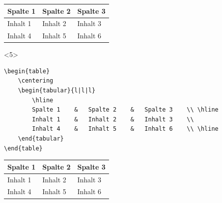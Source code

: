 \begin{frame}[fragile]
\begin{onlyenv}
\begin{outputbox}
			\begin{table}
				\centering
				\begin{tabular}{lll}
					\hline
					Spalte 1	&	Spalte 2	&	Spalte 3	\\ \hline
					Inhalt 1	&	Inhalt 2	&	Inhalt 3	\\
					Inhalt 4	&	Inhalt 5	&	Inhalt 6	\\ \hline	
				\end{tabular}
			\end{table}
		\end{outputbox}
	\end{onlyenv}
	\begin{onlyenv}
		\Code
		\begin{lstlisting}
\begin{table}
	\centering
	\begin{tabular}{l|l|l}
		\hline
		Spalte 1	&	Spalte 2	&	Spalte 3	\\ \hline
		Inhalt 1	&	Inhalt 2	&	Inhalt 3	\\
		Inhalt 4	&	Inhalt 5	&	Inhalt 6	\\ \hline
	\end{tabular}
\end{table}
		\end{lstlisting}
		\Ausgabe
		\begin{outputbox}
			\begin{table}
				\centering
				\begin{tabular}{l|l|l}
					\hline
					Spalte 1	&	Spalte 2	&	Spalte 3	\\ \hline
					Inhalt 1	&	Inhalt 2	&	Inhalt 3	\\
					Inhalt 4	&	Inhalt 5	&	Inhalt 6	\\ \hline	
				\end{tabular}
			\end{table}
		\end{outputbox}
	\end{onlyenv}
\end{frame}
